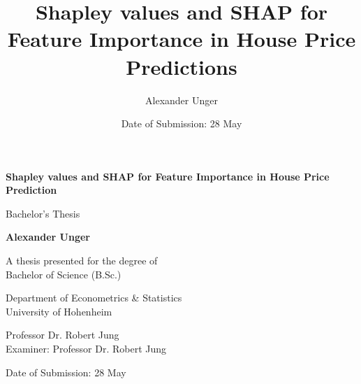 \documentclass[12pt]{article}
\begin{document}
	\clearpage %
	\fontsize{10pt}{12pt}\selectfont
\title{Shapley values and SHAP for Feature Importance in House Price Predictions}
\author{Alexander Unger}
\date{Date of Submission: 28 May}

	
	\begin{titlepage}
		\begin{center}
			\vspace*{1cm}
			
			\textbf{\Large Shapley values and SHAP for Feature Importance in House Price Prediction}
			
			\vspace{0.5cm}
			Bachelor’s Thesis
			
			\vspace{1.5cm}
			
			\textbf{Alexander Unger}
			
			\vfill
			
			A thesis presented for the degree of\\
			Bachelor of Science (B.Sc.)
			
			\vspace{0.8cm}
			
			
			Department of Econometrics \& Statistics\\
			University of Hohenheim
			
			\vspace{0.8cm}
			
			Professor Dr. Robert Jung\\
			Examiner: Professor Dr. Robert Jung
			
			\vspace{0.8cm}
			
			Date of Submission: 28 May
			
		\end{center}
	\end{titlepage}


\tableofcontents

\newpage
{}
\end{document}

